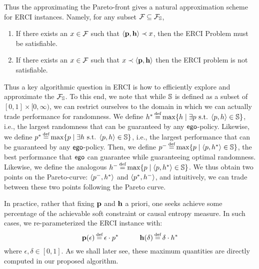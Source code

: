 \noindent
Thus the approximating the Pareto-front gives a natural approximation
scheme for ERCI instances. Namely, for any subset $\mathcal{F}_{} \subseteq
\mathcal{F}_{\mathbb{S}}$,
\begin{enumerate}
\item If there exists an $x \in \mathcal{F}_{}$ such that
$\langle \mathbf{p}, \mathbf{h} \rangle \prec x$, then the ERCI
Problem must be satisfiable.
\item If there exists an $x \in \mathcal{F}_{}$
such that $x \prec \langle \mathbf{p}, \mathbf{h} \rangle$ then the
ERCI problem is not satisfiable.
\end{enumerate}

\begin{example}
	
\end{example}

Thus a key algorithmic question in ERCI is how to efficiently explore
and approximate the $\mathcal{F}_{\mathbb{S}}$.  
To this end, we note that while $\mathbb{S}$ is defined as a subset of $[0,1] \times [0,\infty)$, we can restrict ourselves to the domain in which we can actually trade performance for randomness. 
We define 
$\rndopt \eqdef \max \{ \rndp \mid \exists \scp \text{ s.t. } \langle \scp, \rndp \rangle \in \solutions  \} $, i.e., the largest randomness that can be guaranteed by any $\mathsf{ego}$-policy. 
Likewise, we define 
$\scopt \eqdef \max \{ \scp \mid \exists \rndp \text{ s.t. } \langle \scp, \rndp \rangle \in \solutions  \} $, i.e., the largest performance that can be guaranteed by any $\mathsf{ego}$-policy. 
Then, we define 
$\scmin \eqdef \max \{ \scp \mid \langle \scp, \rndopt \rangle  \in \solutions \}$, the best performance that $\mathsf{ego}$ can guarantee while guaranteeing optimal randomness. 
Likewise, we define  the analogous $\rndmin \eqdef \max \{ \scp \mid \langle \scp, \rndopt \rangle  \in \solutions \}$.
We thus obtain two points on the Pareto-curve: $\langle p^{-}, h^{*} \rangle$ and $\langle p^{*}, h^{-} \rangle$, and intuitively, we can trade between these two points following the Pareto curve.

\begin{remark}
  In practice, rather that fixing $\mathbf{p}$ and $\mathbf{h}$ a
  priori, one seeks achieve some percentage of the achievable soft
  constraint or causal entropy measure.  In such cases, we
  re-parameterized the ERCI instance with:
  \begin{equation}
    \scthreshold(\epsilon) \eqdef \epsilon \cdot \scopt
    \hspace{3em}
    \randomness(\delta) \eqdef  \delta \cdot \rndopt
  \end{equation}
  where $\epsilon, \delta \in [0, 1]$. As we shall later see, these maximum quantities are
  directly computed in our proposed algorithm.
\end{remark}

